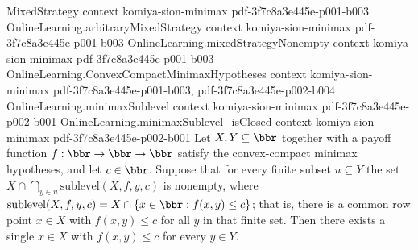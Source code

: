 \begin{lemma}
\label{OnlineLearning.exists_forall_le_of_finite_sublevel_intersections}
\leanok
{}
\proofstep
  {MixedStrategy}
  {context}
  {komiya-sion-minimax}
  {pdf-3f7c8a3e445e-p001-b003}
\proofstep
  {OnlineLearning.arbitraryMixedStrategy}
  {context}
  {komiya-sion-minimax}
  {pdf-3f7c8a3e445e-p001-b003}
\proofstep
  {OnlineLearning.mixedStrategyNonempty}
  {context}
  {komiya-sion-minimax}
  {pdf-3f7c8a3e445e-p001-b003}
\proofstep
  {OnlineLearning.ConvexCompactMinimaxHypotheses}
  {context}
  {komiya-sion-minimax}
  {pdf-3f7c8a3e445e-p001-b003,
    pdf-3f7c8a3e445e-p002-b004}
\proofstep
  {OnlineLearning.minimaxSublevel}
  {context}
  {komiya-sion-minimax}
  {pdf-3f7c8a3e445e-p002-b001}
\proofstep
  {OnlineLearning.minimaxSublevel_isClosed}
  {context}
  {komiya-sion-minimax}
  {pdf-3f7c8a3e445e-p002-b001}
Let $X, Y \subseteq \bbr$ together with a payoff function $f : \bbr \to \bbr \to \bbr$
satisfy the convex-compact minimax hypotheses, and let $c \in \bbr$. Suppose that for
every finite subset $u \subseteq Y$ the set $X \cap \bigcap_{y \in u}
\mathrm{sublevel}(X,f,y,c)$ is nonempty, where $\mathrm{sublevel}(X,f,y,c) = X \cap \{x
\in \bbr : f(x,y) \le c\}$; that is, there is a common row point $x \in X$ with $f(x,y)
\le c$ for all $y$ in that finite set. Then there exists a single $x \in X$ with $f(x,y)
\le c$ for every $y \in Y$.
\end{lemma}
